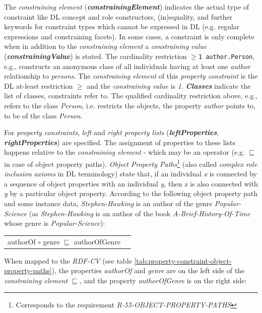 \documentclass{llncs}
\newcommand{\ms}[1]{\texttt{#1}}
\newenvironment{DL}{
  \vspace{0cm}
	\begin{center}
  \begin{tabular}{r l}

}{
  \end{tabular}
	\end{center}
}
\begin{document}
The \emph{constraining element} (\textbf{\emph{constrainingElement}}) indicates the actual type of constraint like DL concept and role constructors, (in)equality, and further keywords for constraint types which cannot be expressed in DL (e.g. regular expressions and constraining facets).
In some cases, a constraint is only complete when in addition to the \emph{constraining element} a \emph{constraining value} (\textbf{\emph{constrainingValue}}) is stated.
The cardinality restriction 
\ms{$\geq$1 author.Person}, e.g., 
constructs an anonymous class of all individuals having at least one \emph{author} relationship to \emph{persons}.
The \emph{constraining element} of this \emph{property constraint} is the DL at-least restriction \emph{$\geq$} and the \emph{constraining value} is \emph{1}.
\textbf{\emph{Classes}} indicate the list of classes, constraints refer to.
The qualified cardinality restriction above, e.g., refers to the class \emph{Person}, 
i.e. restricts the objects, the property \emph{author} points to, to be of the class \emph{Person}.

For \emph{property constraints}, \emph{left} and \emph{right property lists} (\textbf{\emph{leftProperties}}, \textbf{\emph{rightProperties}}) are specified.
The assignment of properties to these lists happens relative to the \emph{constraining element} - which may be an operator (e.g. $\sqsubseteq$ in case of object property paths).
\emph{Object Property Paths}\footnote{Corresponds to the requirement \emph{R-55-OBJECT-PROPERTY-PATHS}} (also called \emph{complex role inclusion axioms} in DL terminology)
state that, if an individual \emph{x} is connected by a sequence of object properties with an individual \emph{y}, 
then \emph{x} is also connected with \emph{y} by a particular object property. 
According to the following object property path and some instance data, \emph{Stephen-Hawking} is an author of the genre \emph{Popular-Science} 
(as \emph{Stephen-Hawking} is an author of the book \emph{A-Brief-History-Of-Time} whose genre is \emph{Popular-Science}):

\begin{DL}
authorOf $\circ$ genre $\sqsubseteq$ authorOfGenre 
\end{DL}

When mapped to the \emph{RDF-CV} (see table \ref{tab:property-constraint-object-property-paths}), the properties \emph{authorOf} and \emph{genre} are on the left side of the \emph{constraining element} \emph{$\sqsubseteq$},
and the property \emph{authorOfGenre} is on the right side:
\end{document}
